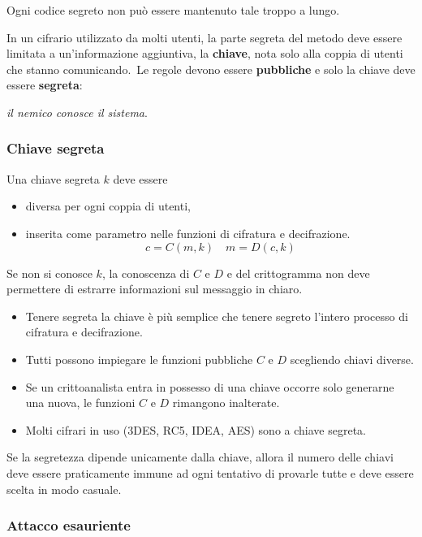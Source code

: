 Ogni codice segreto non può essere mantenuto tale troppo a lungo.\

In un cifrario utilizzato da molti utenti, la parte segreta del metodo deve essere limitata a un'informazione aggiuntiva, la \textbf{chiave}, nota solo alla coppia di utenti che stanno comunicando.\
Le regole devono essere \textbf{pubbliche} e solo la chiave deve essere \textbf{segreta}:
\begin{center}
    \textit{il nemico conosce il sistema}.
\end{center}

\subsubsection{Chiave segreta}
Una chiave segreta $k$ deve essere
\begin{itemize}
    \item diversa per ogni coppia di utenti,
    \item inserita come parametro nelle funzioni di cifratura e decifrazione.
          \[c = C(m,k)\quad m=D(c,k)\]
\end{itemize}

\noindent Se non si conosce $k$, la conoscenza di $C$ e $D$ e del crittogramma non deve permettere di estrarre informazioni sul messaggio in chiaro.\

\begin{itemize}
    \item Tenere segreta la chiave è più semplice che tenere segreto l'intero processo di cifratura e decifrazione.
    \item Tutti possono impiegare le funzioni pubbliche $C$ e $D$ scegliendo chiavi diverse.
    \item Se un crittoanalista entra in possesso di una chiave occorre solo generarne una nuova, le funzioni $C$ e $D$ rimangono inalterate.
    \item Molti cifrari in uso (3DES, RC5, IDEA, AES) sono a chiave segreta.
\end{itemize}

\noindent Se la segretezza dipende unicamente dalla chiave, allora il numero delle chiavi deve essere praticamente immune ad ogni tentativo di provarle tutte e deve essere scelta in modo casuale.\

\subsubsection{Attacco esauriente}

